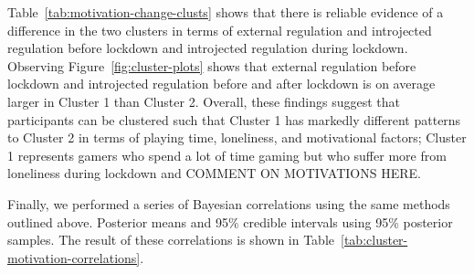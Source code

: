\documentclass[
  english,
  jou,floatsintext]{apa6}
\begin{document}
Table~\ref{tab:motivation-change-clusts} shows that there is reliable evidence of a difference in the two clusters in terms of external regulation and introjected regulation before lockdown and introjected regulation during lockdown. Observing Figure~\ref{fig:cluster-plots} shows that external regulation before lockdown and introjected regulation before and after lockdown is on average larger in Cluster 1 than Cluster 2. Overall, these findings suggest that participants can be clustered such that Cluster 1 has markedly different patterns to Cluster 2 in terms of playing time, loneliness, and motivational factors; Cluster 1 represents gamers who spend a lot of time gaming but who suffer more from loneliness during lockdown and COMMENT ON MOTIVATIONS HERE.

Finally, we performed a series of Bayesian correlations using the same methods outlined above. Posterior means and 95\% credible intervals using 95\% posterior samples. The result of these correlations is shown in Table~\ref{tab:cluster-motivation-correlations}.
\end{document}
